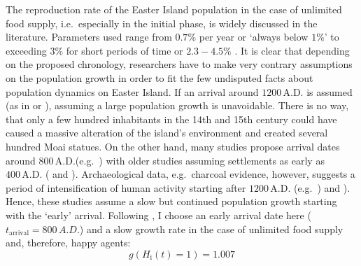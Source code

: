 The reproduction rate of the Easter Island population in the case of unlimited food supply, i.e.\ especially in the initial phase, is widely discussed in the literature.
Parameters used range from $0.7\%$ per year \citep{Bahn2017} or `always below $1\%$' \citep{Brander1998} to exceeding $3\%$ \citep{Hunt2006} for short periods of time or $2.3-4.5\%$ \citep{Brandt2015}.
It is clear that depending on the proposed chronology, researchers have to make very contrary assumptions on the population growth in order to fit the few undisputed facts about population dynamics on Easter Island. 
If an arrival around $1200\, \text{A.D.}$ is assumed (as in \citet{Hunt2007} or \citet{Brandt2015}), assuming a large population growth is unavoidable. 
There is no way, that only a few hundred inhabitants in the 14th and 15th century could have caused a massive alteration of the island's environment and created several hundred Moai statues.
On the other hand, many studies propose arrival dates around $800\, \text{A.D.}$(e.g.\ \citet{Bahn2017}) with older studies assuming settlements as early as $400\, \text{A.D.}$ (\citet{Good2006} and \citet{Brander1998}).
Archaeological data, e.g.\ charcoal evidence, however, suggests a period of intensification of human activity starting after $1200\, \text{A.D.}$ (e.g.\ \citet{Bahn2017}) and \citet{Hunt2006}).
Hence, these studies assume a slow but continued population growth starting with the `early' arrival.%
Following \citet{Bahn2017}, I choose an early arrival date here ($t_\text{arrival}=800\, A.D.$) and a slow growth rate in the case of unlimited food supply and, therefore, happy agents: 
\begin{equation}
	g(H_\text{i}(t)=1) = 1.007
\end{equation}


